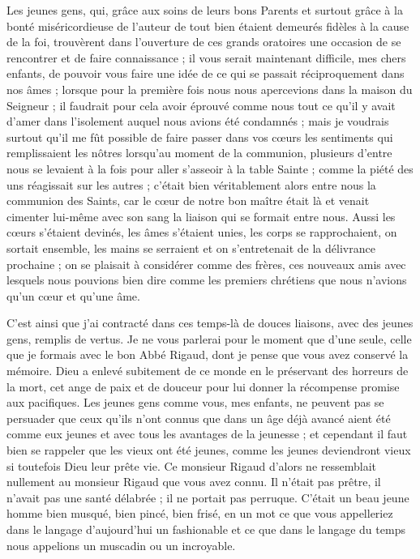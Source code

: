 \documentclass[11pt,a4paper]{report}
\begin{document}
Les jeunes gens, qui, grâce aux soins de leurs bons Parents et surtout grâce à la bonté miséricordieuse de l'auteur de tout bien étaient demeurés fidèles à la cause de la foi, trouvèrent dans l'ouverture de ces grands oratoires une occasion de se rencontrer et de faire connaissance ; il vous serait maintenant difficile, mes chers enfants, de pouvoir vous faire une idée de ce qui se passait réciproquement dans nos âmes ; lorsque pour la première fois nous nous apercevions dans la maison du Seigneur ; il faudrait pour cela avoir éprouvé comme nous tout ce qu'il y avait d'amer dans l'isolement auquel nous avions été condamnés ; mais je voudrais surtout qu'il me fût possible de faire passer dans vos cœurs les sentiments qui remplissaient les nôtres lorsqu'au moment de la communion, plusieurs d'entre nous se levaient à la fois pour aller s'asseoir à la table Sainte ; comme la piété des uns réagissait sur les autres ; c'était bien véritablement alors entre nous la communion des Saints, car le cœur de notre bon maître était là et venait cimenter lui-même avec son sang la liaison qui se formait entre nous. Aussi les cœurs s'étaient devinés, les âmes s'étaient unies, les corps se rapprochaient, on sortait ensemble, les mains se
serraient et on s'entretenait de la délivrance prochaine ; on se plaisait à
considérer comme des frères, ces nouveaux amis avec lesquels nous pouvions bien
dire comme les premiers chrétiens que nous n'avions qu'un cœur et qu'une âme.

C'est ainsi que j'ai contracté dans ces temps-là de douces liaisons, avec des
jeunes gens, remplis de vertus. Je ne vous parlerai pour le moment que d'une
seule, celle que je formais avec le bon Abbé Rigaud, dont je pense que vous avez
conservé la mémoire. Dieu a enlevé subitement de ce monde en le préservant des
horreurs de la mort, cet ange de paix et de douceur pour lui donner la
récompense promise aux pacifiques. Les jeunes gens comme vous, mes enfants, ne
peuvent pas se persuader que ceux qu'ils n'ont connus que dans un âge déjà
avancé aient été comme eux jeunes et avec tous les avantages de la jeunesse ; et
cependant il faut bien se rappeler que les vieux ont été jeunes, comme les
jeunes deviendront vieux si toutefois Dieu leur prête vie. Ce monsieur Rigaud
d'alors ne ressemblait nullement au monsieur Rigaud que vous avez connu. Il
n'était pas prêtre, il n'avait pas une santé délabrée ; il ne portait pas
perruque. C'était un beau jeune homme bien musqué, bien pincé, bien frisé, en un
mot ce que vous appelleriez dans le langage d'aujourd'hui un fashionable et ce
que dans le langage du temps nous appelions un muscadin ou un incroyable.
\end{document}
